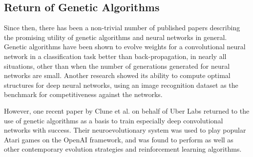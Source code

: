\documentclass[12pt,a4paper]{article}
\begin{document}


    \subsection{Return of Genetic Algorithms}

        Since then, there has been a non-trivial number of published papers describing the promising utility of genetic algorithms and neural networks in general. Genetic algorithms have been shown to evolve weights for a convolutional neural network in a classification task better than back-propagation, in nearly all situations, other than when the number of generations generated for neural networks are small. \cite{perez_apply_nodate} Another research showed its ability to compute optimal structures for deep neural networks, using an image recognition dataset as the benchmark for competitiveness against the networks. \cite{xie_genetic_2017}
        

        However, one recent paper by Clune et al. on behalf of Uber Labs returned to the use of genetic algorithms as a basis to train especially deep convolutional networks with success. \cite{such_deep_2017} Their neuroevolutionary system was used to play popular Atari games on the OpenAI framework, and was found to perform as well as other contemporary evolution strategies and reinforcement learning algorithms. 
\end{document}

